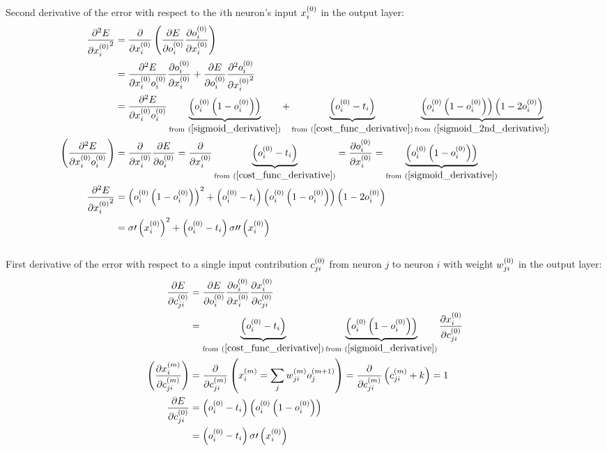 \\[5pt]Second derivative of the error with respect to the $i$th neuron's input $x_{i}^{(0)}$ in the output layer:
\begin{align}
\pdv[2]{E}{{\Input i 0}} &= \pdv{}{\Input i 0}
\left(\pdv{E}{\Out i 0}\pdv{\Out i 0}{\Input i 0}\right) 
\\
&= \pdv{{^2}E}{{\Input i 0}{\Out i 0}}\pdv{\Out i 0}{\Input i 0} + \pdv{E}{\Out i 0}\pdv[2]{\Out i 0}{{\Input i 0}}
\\
&= \pdv{{^2}E}{{\Input i 0}{\Out i 0}}\underbrace{\left(\Out i 0 \left(1 - \Out i 0\right)\right)}_{{\text{from} \ (\ref{sigmoid_derivative})}} + \underbrace{\left(\Out i 0 - \Target i\right)}_{\text{from} \ (\ref{cost_func_derivative})}\underbrace{\left(\Out i 0 \left(1 - \Out i 0\right)\right)\left(1 - 2\Out i 0\right) }_{\text{from}\ (\ref{sigmoid_2nd_derivative})}
\\
\left(\pdv{{^2}E}{{\Input i 0}{\Out i 0}}\right) &= \pdv{}{\Input i 0}\pdv{E}{\Out i 0} = \pdv{}{\Input i 0}\underbrace{\left(\Out i 0 - \Target i\right)}_{\text{from} \ (\ref{cost_func_derivative})} = \pdv{\Out i 0}{\Input i 0} = \underbrace{\left(\Out i 0 \left(1 - \Out i 0\right)\right)}_{{\text{from} \ (\ref{sigmoid_derivative})}} 
\\
\pdv[2]{E}{{\Input i 0}}&= \left(\Out i 0 \left(1 - \Out i 0\right)\right)^2 + \left(\Out i 0 - \Target i\right)\left(\Out i 0 \left(1 - \Out i 0\right)\right)\left(1 - 2\Out i 0\right) 
\\
&= \sigma\prime\left(\Input i 0\right)^2 + \left(\Out i 0 - \Target i\right)\sigma\prime\prime\left(\Input i 0\right)\label{d2edx2}
\end{align}
\\[5pt]First derivative of the error with respect to a single input contribution $c_{ji}^{(0)}$ from neuron $j$ to neuron $i$ with weight $w_{ji}^{(0)}$ in the output layer:
\begin{align}
\pdv{E}{\Con j i 0} &= 
\pdv{E}{\Out i 0}
\pdv{\Out i 0}{\Input i 0}
\pdv{\Input i 0}{\Con j i 0}
\\
&= \underbrace{\left(\Out i 0 - \Target i \right)}_{\text{from} \ (\ref{cost_func_derivative})} \underbrace{\left(\Out i 0 \left(1 - \Out i 0\right) \right)}_{\text{from} \ (\ref{sigmoid_derivative})} \pdv{\Input i 0}{\Con j i 0} 
\\
\left( \pdv{\Input i m}{\Con j i m}\right) &= \pdv{}{\Con j i m}\left(\Input i m = \sum_j\Weight j i m\Out j {m+1} \right) = \pdv{}{\Con j i m} \left(\Con j i m + k \right) = 1\label{dxdc} 
\\
\pdv{E}{\Con j i 0}&= \left(\Out i 0 - \Target i \right) \left(\Out i 0 \left(1 - \Out i 0\right) \right)
\\
&= \left(\Out i 0 - \Target i \right) \sigma\prime\left(\Input i 0\right)\label{dedc}
\end{align}
